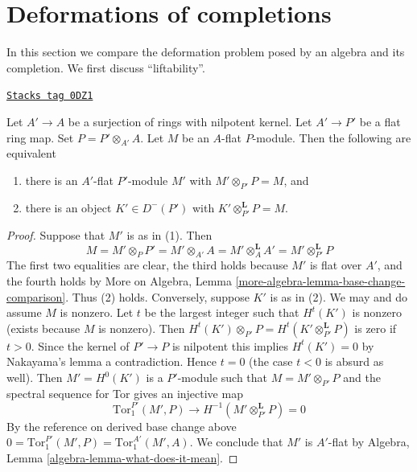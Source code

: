 \section{Deformations of completions}
\label{examples-defos-section-compare}
In this section we compare the deformation problem posed
by an algebra and its completion.
We first discuss ``liftability''.

\begin{lemma}
\label{examples-defos-lemma-lift-equivalence-module-derived}
\href{https://stacks.math.columbia.edu/tag/0DZ1}{\texttt{Stacks tag 0DZ1}}

Let $A' \to A$ be a surjection of rings with nilpotent kernel.
Let $A' \to P'$ be a flat ring map.
Set $P = P' \otimes_{A'} A$.
Let $M$ be an $A$-flat $P$-module.
Then the following are equivalent
\begin{enumerate}
\item there is an $A'$-flat $P'$-module $M'$ with
$M' \otimes_{P'} P = M$, and
\item there is an object $K' \in D^-(P')$ with
$K' \otimes_{P'}^\mathbf{L} P = M$.
\end{enumerate}
\end{lemma}

\begin{proof}
Suppose that $M'$ is as in (1). Then
$$
M = M' \otimes_P P' = M' \otimes_{A'} A =
M' \otimes_A^\mathbf{L} A' = M' \otimes_{P'}^\mathbf{L} P
$$
The first two equalities are clear, the third holds because
$M'$ is flat over $A'$, and the fourth holds by
More on Algebra, Lemma \ref{more-algebra-lemma-base-change-comparison}.
Thus (2) holds. Conversely, suppose $K'$ is as in (2).
We may and do assume $M$ is nonzero.
Let $t$ be the largest integer such that $H^t(K')$ is nonzero
(exists because $M$ is nonzero).
Then $H^t(K') \otimes_{P'} P = H^t(K' \otimes_{P'}^\mathbf{L} P)$
is zero if $t > 0$. Since the kernel of $P' \to P$ is nilpotent
this implies $H^t(K') = 0$ by Nakayama's lemma a contradiction.
Hence $t = 0$ (the case $t < 0$ is absurd as well).
Then $M' = H^0(K')$ is a $P'$-module such that $M = M' \otimes_{P'} P$
and the spectral sequence for Tor gives an injective map
$$
\text{Tor}_1^{P'}(M', P) \to H^{-1}(M' \otimes_{P'}^\mathbf{L} P) = 0
$$
By the reference on derived base change above
$0 = \text{Tor}_1^{P'}(M', P) = \text{Tor}_1^{A'}(M', A)$.
We conclude that $M'$ is $A'$-flat by
Algebra, Lemma \ref{algebra-lemma-what-does-it-mean}.
\end{proof}

